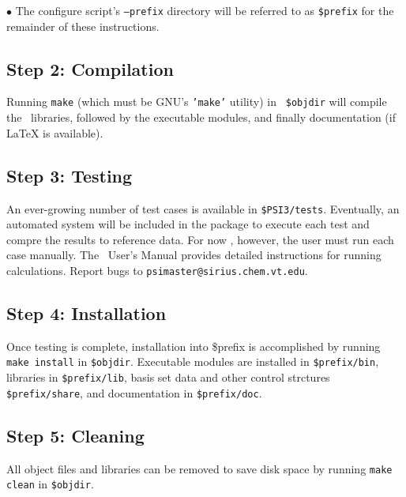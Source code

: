 \documentclass[12pt]{article}
\begin{document}
$\bullet$ The configure script's {\tt --prefix} directory will be referred
to as {\tt \$prefix} for the remainder of these instructions.

\subsection{Step 2: Compilation}

Running {\tt make} (which must be GNU's {\tt 'make'} utility) in {\tt
\$objdir} will compile the \PSIthree\ libraries, followed by the executable
modules, and finally documentation (if LaTeX is available).

\subsection{Step 3: Testing}

An ever-growing number of test cases is available in {\tt \$PSI3/tests}.
Eventually, an automated system will be included in the package to execute
each test and compre the results to reference data.  For now , however,
the user must run each case manually.  The \PSIthree\ User's Manual
provides detailed instructions for running calculations.  Report bugs to
{\tt psimaster@sirius.chem.vt.edu}.

\subsection{Step 4: Installation}

Once testing is complete, installation into \$prefix is accomplished by
running {\tt make install} in {\tt \$objdir}.   Executable modules are
installed in {\tt \$prefix/bin}, libraries in {\tt \$prefix/lib}, basis set
data and other control strctures {\tt \$prefix/share}, and documentation
in {\tt \$prefix/doc}.

\subsection{Step 5: Cleaning}

All object files and libraries can be removed to save disk space by running
{\tt make clean} in {\tt \$objdir}.
\end{document}

